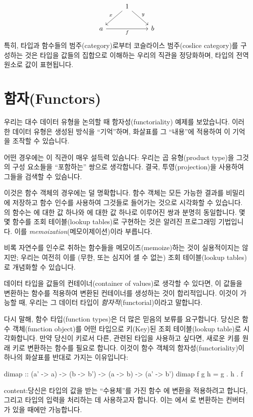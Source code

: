 \documentclass[DaoFP]{subfiles}
\begin{document}
 \[
 \begin{tikzcd}
& 1
 \arrow[rd, "y"]
 \arrow[ld, "x"']
 \\
a
\arrow[rr, "f"']
&& b
  \end{tikzcd}
\]
특히, 타입과 함수들의 범주(category)로부터 코슬라이스 범주(coslice category)를 구성하는 것은 타입을 값들의 집합으로 이해하는 우리의 직관을 정당화하며, 타입의 전역 원소로 값이 표현됩니다.

\section{함자(Functors)}

우리는 대수 데이터 유형을 논의할 때 함자성(functoriality) 예제를 보았습니다. 이러한 데이터 유형은 생성된 방식을 ``기억''하며, 화살표를 그 ``내용''에 적용하여 이 기억을 조작할 수 있습니다.

어떤 경우에는 이 직관이 매우 설득력 있슴니다: 우리는 곱 유형(product type)을 그것의 구성 요소들을 ``포함하는'' 쌍으로 생각합니다. 결국, 투영(projection)을 사용하여 그들을 검색할 수 있슴니다.

이것은 함수 객체의 경우에는 덜 명확합니다. 함수 객체는 모든 가능한 결과를 비밀리에 저장하고 함수 인수를 사용하여 그것들로 들어가는 것으로 시각화할 수 있습니다. 의 함수는 에 대한 값 하나와 에 대한 값 하나로 이루어진 쌍과 분명히 동일합니다. 몇몇 함수를 조회 테이블(lookup tables)로 구현하는 것은 알려진 프로그래밍 기법입니다. 이를 \emph{memoization}(메모이제이션)이라 부릅니다.

비록 자연수를 인수로 취하는 함수들을 메모이즈(memoize)하는 것이 실용적이지는 않지만; 우리는 여전히 이를 (무한, 또는 심지어 셀 수 없는) 조회 테이블(lookup tables)로 개념화할 수 있습니다.

데이터 타입을 값들의 컨테이너(container of values)로 생각할 수 있다면, 이 값들을 변환하는 함수를 적용하여 변환된 컨테이너를 생성하는 것이 합리적입니다. 이것이 가능할 때, 우리는 그 데이터 타입이 \emph{함자적}(functorial)이라고 말합니다.

다시 말해, 함수 타입(function types)은 더 많은 믿음의 보류를 요구합니다. 당신은 함수 객체(function object)를 어떤 타입으로 키(Key)된 조회 테이블(lookup table)로 시각화합니다. 만약 당신이 키로서 다른, 관련된 타입을 사용하고 싶다면, 새로운 키를 원래 키로 변환하는 함수를 필요로 합니다. 이것이 함수 객체의 함자성(functoriality)이 하나의 화살표를 반대로 가지는 이유입니다:
\begin{haskell}
dimap :: (a' -> a) -> (b -> b') -> (a -> b) -> (a' -> b')
dimap f g h = g . h . f
\end{haskell}
content:당신은  타입의 값을 받는 ``수용체''를 가진 함수 에 변환을 적용하려고 합니다, 그리고  타입의 입력을 처리하는 데 사용하고자 합니다. 이는 에서 로 변환하는  컨버터가 있을 때에만 가능합니다.
\end{document}
